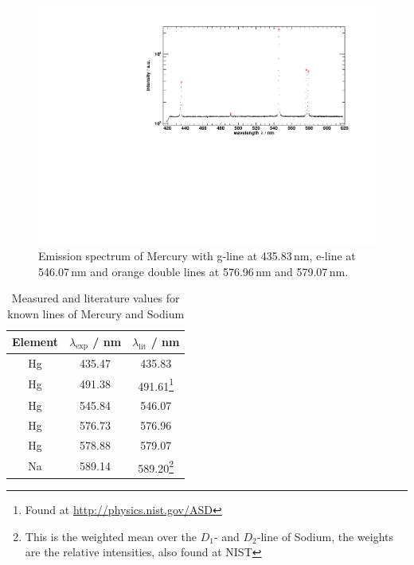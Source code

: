 \begin{figure}[H]
\begin{center}
  \includegraphics[width=\textwidth]{../img/HgPeaks.pdf}
  \caption[---]{Emission spectrum of Mercury with
  g-line at 435.83\,nm,
  e-line at 546.07\,nm and
  orange double lines at 576.96\,nm and 579.07\,nm.}
  \label{img:hg:spectrum}
\end{center}
\end{figure}

\begin{savenotes} %
\begin{table}[H]
\caption{Measured and literature values for known lines of Mercury and Sodium}
\begin{center}
\begin{tabular}{|c|c|c|}
\hline
  Element & $\lambda_{\text{exp}}$ / nm & $\lambda_{\text{lit}}$ / nm \\ \hline
    Hg & 435.47 & 435.83 \\ \hline
    Hg & 491.38 & 491.61\footnote{Found at \url{http://physics.nist.gov/ASD}} \\ \hline
    Hg & 545.84 & 546.07 \\ \hline
    Hg & 576.73 & 576.96 \\ \hline
    Hg & 578.88 & 579.07 \\ \hline
    Na & 589.14 & 589.20\footnote{This is the weighted mean over the $D_1$- and $D_2$-line of Sodium, the weights are the relative intensities, also found at NIST} \\ \hline
\end{tabular}
\end{center}
\label{tab:energygauge}
\end{table}
\end{savenotes}

